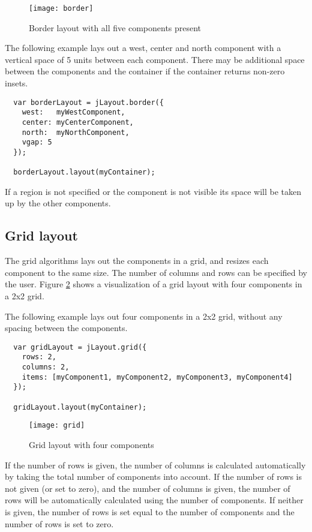 \begin{figure}[h!]
\centering
\texttt{[image: border]}
\caption{Border layout with all five components present}
\label{border}
\end{figure}

The following example lays out a west, center and north component with a vertical space of 5 units between each component. There may be additional space between the components and the container if the container returns non-zero insets.
\begin{verbatim}
  var borderLayout = jLayout.border({
    west:   myWestComponent,
    center: myCenterComponent,
    north:  myNorthComponent,
    vgap: 5
  });

  borderLayout.layout(myContainer);
\end{verbatim}
If a region is not specified or the component is not visible its space will be taken up by the other components. 

\subsection{Grid layout}
The grid algorithms lays out the components in a grid, and resizes each component to the same size. The number of columns and rows can be specified by the user. Figure \ref{grid} shows a visualization of a grid layout with four components in a 2x2 grid. 

The following example lays out four components in a 2x2 grid, without any spacing between the components.
\begin{verbatim}
  var gridLayout = jLayout.grid({
    rows: 2,
    columns: 2,
    items: [myComponent1, myComponent2, myComponent3, myComponent4]
  });

  gridLayout.layout(myContainer);
\end{verbatim}

\begin{figure}[h]
\centering
\texttt{[image: grid]}
\caption{Grid layout with four components}
\label{grid}
\end{figure}

If the number of rows is given, the number of columns is calculated automatically by taking the total number of components into account. If the number of rows is not given (or set to zero), and the number of columns is given, the number of rows will be automatically calculated using the number of components. If neither is given, the number of rows is set equal to the number of components and the number of rows is set to zero.

